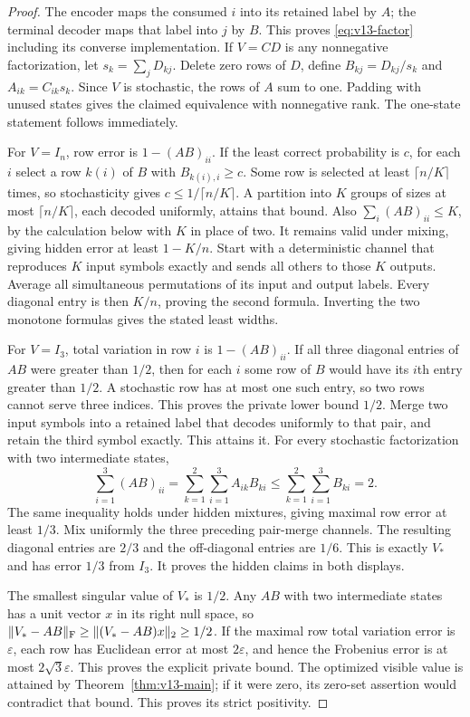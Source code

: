\begin{proof}
The encoder maps the consumed $i$ into its retained label by $A$; the
terminal decoder maps that label into $j$ by $B$. This proves
\eqref{eq:v13-factor} including its converse implementation. If
$V=CD$ is any nonnegative factorization, let $s_k=\sum_jD_{kj}$.
Delete zero rows of $D$, define $B_{kj}=D_{kj}/s_k$ and
$A_{ik}=C_{ik}s_k$. Since $V$ is stochastic, the rows of $A$ sum to one.
Padding with unused states gives the claimed equivalence with
nonnegative rank. The one-state statement follows immediately.

For $V=I_n$, row error is $1-(AB)_{ii}$. If the least correct
probability is $c$, for each $i$ select a row $k(i)$ of $B$ with
$B_{k(i),i}\ge c$. Some row is selected at least $\lceil n/K\rceil$
times, so stochasticity gives $c\le1/\lceil n/K\rceil$. A partition
into $K$ groups of sizes at most $\lceil n/K\rceil$, each decoded
uniformly, attains that bound. Also $\sum_i(AB)_{ii}\le K$, by the
calculation below with $K$ in place of two. It remains valid under
mixing, giving hidden error at least $1-K/n$. Start with a deterministic
channel that reproduces $K$ input symbols exactly and sends all others
to those $K$ outputs. Average all simultaneous permutations of its
input and output labels. Every diagonal entry is then $K/n$, proving
the second formula. Inverting the two monotone formulas gives the
stated least widths.

For $V=I_3$, total variation in row $i$ is $1-(AB)_{ii}$.
If all three diagonal entries of $AB$ were greater than $1/2$, then
for each $i$ some row of $B$ would have its $i$th entry greater than
$1/2$. A stochastic row has at most one such entry, so two rows cannot
serve three indices. This proves the private lower bound $1/2$.
Merge two input symbols into a retained label that decodes uniformly
to that pair, and retain the third symbol exactly. This attains it.
For every stochastic factorization with two intermediate states,
\[
 \sum_{i=1}^3(AB)_{ii}
 =\sum_{k=1}^2\sum_{i=1}^3 A_{ik}B_{ki}
 \le\sum_{k=1}^2\sum_{i=1}^3B_{ki}=2.
\]
The same inequality holds under hidden mixtures, giving maximal row
error at least $1/3$. Mix uniformly the three preceding pair-merge
channels. The resulting diagonal entries are $2/3$ and the off-diagonal
entries are $1/6$. This is exactly $V_*$ and has error $1/3$ from $I_3$.
It proves the hidden claims in both displays.

The smallest singular value of $V_*$ is $1/2$. Any $AB$ with two
intermediate states has a unit vector $x$ in its right null space, so
$\|V_*-AB\|_{\rm F}\ge\|(V_*-AB)x\|_2\ge1/2$.
If the maximal row total variation error is $\varepsilon$, each row
has Euclidean error at most $2\varepsilon$, and hence the Frobenius
error is at most $2\sqrt3\varepsilon$. This proves the explicit private
bound. The optimized visible value is attained by
Theorem~\ref{thm:v13-main}; if it were zero, its zero-set assertion
would contradict that bound. This proves its strict positivity.
\end{proof}

